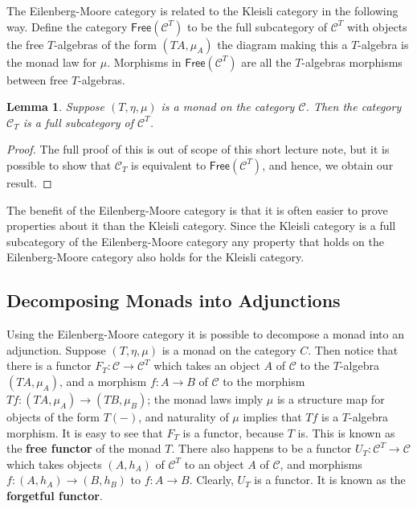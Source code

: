 \documentclass{article}
\let\mto\to
\let\to\relax
\newcommand{\to}{\rightarrow}
\newcommand{\cat}[1]{\mathcal{#1}}
\newtheorem{lemma}[theorem]{Lemma}
\begin{document}
The Eilenberg-Moore category is related to the Kleisli category in the
following way.  Define the category $\mathsf{Free}(\cat{C}^T)$ to be
the full subcategory of $\cat{C}^T$ with objects the free $T$-algebras
of the form $(TA,\mu_A)$ the diagram making this a $T$-algebra is the
monad law for $\mu$. Morphisms in $\mathsf{Free}(\cat{C}^T)$ are all
the $T$-algebras morphisms between free $T$-algebras.
\begin{lemma}
  \label{lemma:the_kleisli_category_is_a_full_subcategory_of_the_eilenberg-moore_category}
  Suppose $(T,\eta,\mu)$ is a monad on the category $\cat{C}$.  Then
  the category $\cat{C}_T$ is a full subcategory of $\cat{C}^T$.
\end{lemma}
\begin{proof}
  The full proof of this is out of scope of this short lecture note,
  but it is possible to show that $\cat{C}_T$ is equivalent to
  $\mathsf{Free}(\cat{C}^T)$, and hence, we obtain our result.
\end{proof}

The benefit of the Eilenberg-Moore category is that it is often easier
to prove properties about it than the Kleisli category.  Since the
Kleisli category is a full subcategory of the Eilenberg-Moore category
any property that holds on the Eilenberg-Moore category also holds for
the Kleisli category.

\subsection{Decomposing Monads into Adjunctions}
\label{subsec:decomposing_monads_into_adjunctions}
Using the Eilenberg-Moore category it is possible to decompose a monad
into an adjunction.  Suppose $(T, \eta,\mu)$ is a monad on the
category $C$.  Then notice that there is a functor $F_T : \cat{C} \mto
\cat{C}^T$ which takes an object $A$ of $\cat{C}$ to the $T$-algebra
$(TA,\mu_A)$, and a morphism $f : A \mto B$ of $\cat{C}$ to the
morphism $Tf : (TA, \mu_A) \mto (TB,\mu_B)$; the monad laws imply
$\mu$ is a structure map for objects of the form $T(-)$, and
naturality of $\mu$ implies that $Tf$ is a $T$-algebra morphism. It is
easy to see that $F_T$ is a functor, because $T$ is. This is known as
the \textbf{free functor} of the monad $T$.  There also happens to be
a functor $U_T : \cat{C}^T \mto \cat{C}$ which takes objects $(A,h_A)$
of $\cat{C}^T$ to an object $A$ of $\cat{C}$, and morphisms $f :
(A,h_A) \mto (B,h_B)$ to $f : A \mto B$.  Clearly, $U_T$ is a functor.
It is known as the \textbf{forgetful functor}.
\end{document}
